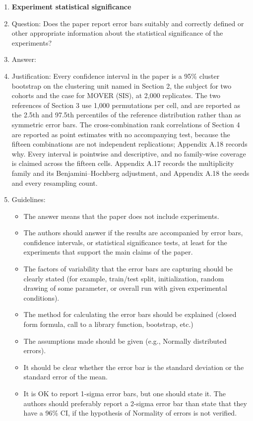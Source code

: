 \begin{enumerate}
\item {\bf Experiment statistical significance}
    \item[] Question: Does the paper report error bars suitably and correctly defined or other appropriate information about the statistical significance of the experiments?
    \item[] Answer: \answerYes{}
    \item[] Justification: Every confidence interval in the paper is a 95\% cluster bootstrap on the clustering unit named in Section 2, the subject for two cohorts and the case for MOVER (SIS), at 2,000 replicates. The two references of Section 3 use 1,000 permutations per cell, and are reported as the 2.5th and 97.5th percentiles of the reference distribution rather than as symmetric error bars. The cross-combination rank correlations of Section 4 are reported as point estimates with no accompanying test, because the fifteen combinations are not independent replications; Appendix A.18 records why. Every interval is pointwise and descriptive, and no family-wise coverage is claimed across the fifteen cells. Appendix A.17 records the multiplicity family and its Benjamini--Hochberg adjustment, and Appendix A.18 the seeds and every resampling count.
    \item[] Guidelines:
    \begin{itemize}
        \item The answer \answerNA{} means that the paper does not include experiments.
        \item The authors should answer \answerYes{} if the results are accompanied by error bars, confidence intervals, or statistical significance tests, at least for the experiments that support the main claims of the paper.
        \item The factors of variability that the error bars are capturing should be clearly stated (for example, train/test split, initialization, random drawing of some parameter, or overall run with given experimental conditions).
        \item The method for calculating the error bars should be explained (closed form formula, call to a library function, bootstrap, etc.)
        \item The assumptions made should be given (e.g., Normally distributed errors).
        \item It should be clear whether the error bar is the standard deviation or the standard error of the mean.
        \item It is OK to report 1-sigma error bars, but one should state it. The authors should preferably report a 2-sigma error bar than state that they have a 96\% CI, if the hypothesis of Normality of errors is not verified.

\end{itemize}
\end{enumerate}
